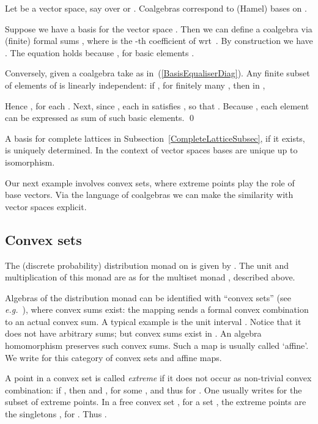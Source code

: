 \documentclass{LMCS}
\newenvironment{myproof}[1][Proof]{ \begin{trivlist}\item[\hskip \labelsep {\bfseries #1}]}{ \end{trivlist}}
\begin{document}
\begin{thm}
\label{OperatorCoalgThm}
Let  be a vector space, say over  or .
Coalgebras  correspond to (Hamel)
bases on .
\end{thm}



\begin{myproof}
Suppose we have a basis  for the vector space . Then
we can define a coalgebra  via (finite) formal sums , where  is the -th coefficient of
 wrt\ .  By construction we have
. The equation  holds because , for basic elements
.

Conversely, given a coalgebra  take  as
in~(\ref{BasisEqualiserDiag}). Any finite subset of elements of
 is linearly independent: if ,
for finitely many , then in ,


\noindent Hence , for each . Next, since , each  in 
satisfies , so that . Because
, each element  can be
expressed as sum of such basic elements. \qed
\end{myproof}



A basis for complete lattices in
Subsection~\ref{CompleteLatticeSubsec}, if it exists, is uniquely
determined. In the context of vector spaces bases are unique up to
isomorphism.

Our next example involves convex sets, where extreme points play the
role of base vectors. Via the language of coalgebras we can make the
similarity with vector spaces explicit.


\subsection{Convex sets}\label{ConvexSubsec}

The (discrete probability) distribution monad  on  is
given by .  The unit and multiplication of this monad are as for the
multiset monad , described above.

Algebras of the distribution monad can be identified with ``convex
sets'' (see \textit{e.g.}~\cite{Jacobs10e}), where convex sums exist:
the mapping  sends a formal convex combination
to an actual convex sum. A typical example is the unit interval
. Notice that it does not have arbitrary sums; but convex sums
exist in .  An algebra homomorphism preserves such convex
sums. Such a map is usually called `affine'. We write  for
this category  of convex sets and affine maps.

A point  in a convex set  is called \textit{extreme} if it
does not occur as non-trivial convex combination: if , then  and , for some , and
thus  for . One usually writes  for the subset of extreme points. In a free convex set ,
for a set , the extreme points are the singletons ,
for . Thus .
\end{document}
